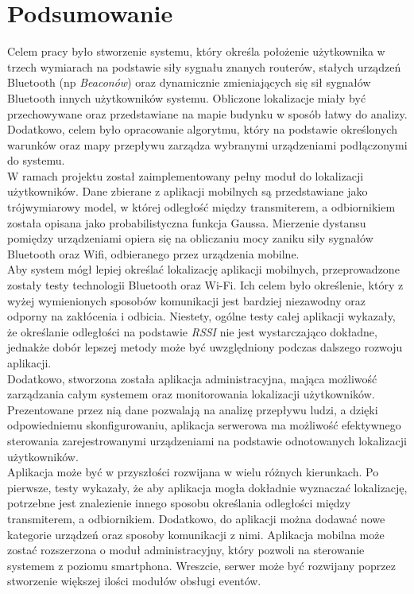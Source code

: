\section{Podsumowanie}
Celem pracy było stworzenie systemu, który określa położenie użytkownika w trzech wymiarach na podstawie siły sygnału znanych routerów, stałych urządzeń Bluetooth (np \textit{Beaconów}) oraz dynamicznie zmieniających się sił sygnałów Bluetooth innych użytkowników systemu. Obliczone lokalizacje miały być przechowywane oraz przedstawiane na mapie budynku w sposób łatwy do analizy. Dodatkowo, celem było opracowanie algorytmu, który na podstawie określonych warunków oraz mapy przepływu zarządza wybranymi urządzeniami podłączonymi do systemu.\\
W ramach projektu został zaimplementowany pełny moduł do lokalizacji użytkowników. Dane zbierane z aplikacji mobilnych są przedstawiane jako trójwymiarowy model, w której odległość między transmiterem, a odbiornikiem została opisana jako probabilistyczna funkcja Gaussa. Mierzenie dystansu pomiędzy urządzeniami opiera się na obliczaniu mocy zaniku siły sygnałów Bluetooth oraz Wifi, odbieranego przez urządzenia mobilne.\\
Aby system mógł lepiej określać lokalizację aplikacji mobilnych, przeprowadzone zostały testy technologii Bluetooth oraz Wi-Fi. Ich celem było określenie, który z wyżej wymienionych sposobów komunikacji jest bardziej niezawodny oraz odporny na zakłócenia i odbicia. Niestety, ogólne testy całej aplikacji wykazały, że określanie odległości na podstawie \textit{RSSI} nie jest wystarczająco dokładne, jednakże dobór lepszej metody może być uwzględniony podczas dalszego rozwoju aplikacji.\\
Dodatkowo, stworzona została aplikacja administracyjna, mająca możliwość zarządzania całym systemem oraz monitorowania lokalizacji użytkowników. Prezentowane przez nią dane pozwalają na analizę przepływu ludzi, a dzięki odpowiedniemu skonfigurowaniu, aplikacja serwerowa ma możliwość efektywnego sterowania zarejestrowanymi urządzeniami na podstawie odnotowanych lokalizacji użytkowników.\\
Aplikacja może być w przyszłości rozwijana w wielu różnych kierunkach. Po pierwsze, testy wykazały, że aby aplikacja mogła dokładnie wyznaczać lokalizację, potrzebne jest znalezienie innego sposobu określania odległości między transmiterem, a odbiornikiem. Dodatkowo, do aplikacji można dodawać nowe kategorie urządzeń oraz sposoby komunikacji z nimi. Aplikacja mobilna może zostać rozszerzona o moduł administracyjny, który pozwoli na sterowanie systemem z poziomu smartphona. Wreszcie, serwer może być rozwijany poprzez  stworzenie większej ilości modułów obsługi eventów.\\



